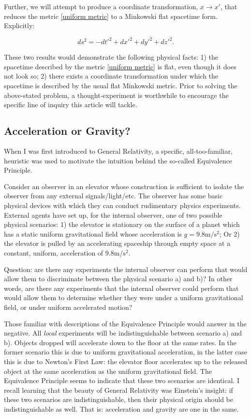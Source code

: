 \documentclass[11pt]{article}
\begin{document}
Further, we will attempt to produce a coordinate transformation, $x \rightarrow x'$, that reduces the metric \eqref{uniform metric} to a Minkowski flat spacetime form. Explicitly:

\begin{equation}
    \label{minkowski metric}
    ds^2 = -dt'^2 + dx'^2 + dy'^2 + dz'^2.
\end{equation}

These two results would demonstrate the following physical facts: 1) the spacetime described by the metric \eqref{uniform metric} is flat, even though it does not look so; 2) there exists a coordinate transformation under which the spacetime is described by the usual flat Minkowski metric. Prior to solving the above-stated problem, a thought-experiment is worthwhile to encourage the specific line of inquiry this article will tackle.

\subsection{Acceleration or Gravity?}

When I was first introduced to General Relativity, a specific, all-too-familiar, heuristic was used to motivate the intuition behind the so-called Equivalence Principle. 

Consider an observer in an elevator whose construction is sufficient to isolate the observer from any external signals/light/etc. The observer has some basic physical devices with which they can conduct rudimentary physics experiments. External agents have set up, for the internal observer, one of two possible physical scenarios: 1) the elevator is stationary on the surface of a planet which has a static uniform gravitational field whose acceleration is $g=9.8 \mathrm{m}/\mathrm{s}^2$; Or 2) the elevator is pulled by an accelerating spaceship through empty space at a constant, uniform, acceleration of $9.8 \mathrm{m}/\mathrm{s}^2$.

Question: are there any experiments the internal observer can perform that would allow them to discriminate between the physical scenario a) and b)? In other words, are there any experiments that the internal observer could perform that would allow them to determine whether they were under a uniform gravitational field, or under uniform accelerated motion?

Those familiar with descriptions of the Equivalence Principle would answer in the negative. All \textit{local} experiments will be indistinguishable between scenario a) and b). Objects dropped will accelerate down to the floor at the same rates. In the former scenario this is due to uniform gravitational acceleration, in the latter case this is due to Newton's First Law: the elevator floor accelerates up to the released object at the same acceleration as the uniform gravitational field. The Equivalence Principle seems to indicate that these two scenarios are identical. I recall learning that the beauty of General Relativity was Einstein's insight: if these two scenarios are indistinguishable, then their physical origin should be indistinguishable as well. That is: acceleration and gravity are one in the same.
\end{document}
